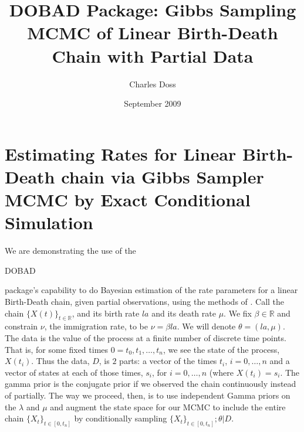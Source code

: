 \documentclass[12pt]{article}
\title{DOBAD Package: 
  Gibbs Sampling MCMC of Linear Birth-Death Chain with Partial Data}
\author{Charles Doss}
\date{September 2009}
\def\R{\mathbb{R}}
\begin{document}
\begin{titlepage}
\maketitle
\end{titlepage}


\vspace{-3.7mm} %






\part{Estimating Rates for Linear Birth-Death chain via Gibbs Sampler MCMC by
  Exact Conditional Simulation}

We are demonstrating the use of the
\begin{verb}
DOBAD
\end{verb}
package's capability to do Bayesian estimation of the rate parameters
for a linear Birth-Death chain, given partial observations, using 
the methods of \citet{DSHKM2010EM}.  Call the
chain $\{X(t)\}_{t \in \R}$, and its birth rate $la$ and its death
rate $\mu$.  We fix $\beta \in \R$ and constrain $\nu$, the
immigration rate, to be $\nu=\beta la$.  We will denote $\theta = (la,
\mu)$.  The data is the value of the process at a finite number of
discrete time points.  That is, for some fixed times $0=t_0, t_1,
\ldots, t_n$, we see the state of the process, $X(t_i)$.  Thus the
data, $D$, is $2$ parts: a vector of the times $t_i$, $i= 0, \ldots,
n$ and a vector of states at each of those times, $s_i$, for $i=0,
\ldots, n$ (where $X(t_i) = s_i$.  The gamma prior is the conjugate
prior if we observed the chain continuously instead of partially.  The
way we proceed, then, is to use independent Gamma priors on the
$\lambda$ and $\mu$ and augment the state space for our MCMC to include
the entire chain $\{X_t\}_{t \in [0,t_n]}$ by conditionally 
sampling $\{X_t\}_{t \in [0,t_n]};\theta | D$.
\end{document}
